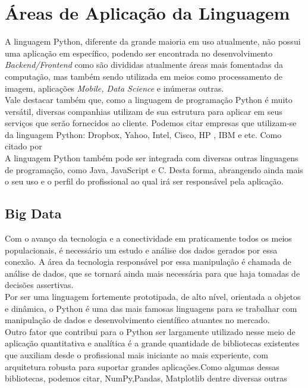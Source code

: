    \section{\'{A}reas de Aplica\c{c}\~{a}o da Linguagem}
   A linguagem Python, diferente da grande maioria em uso atualmente, não possui uma aplicação em específico, podendo ser encontrada no desenvolvimento \textit{Backend/Frontend} como são divididas atualmente áreas mais fomentadas da computação, mas também sendo utilizada em meios como processamento de imagem, aplicações \textit{Mobile, Data Science} e inúmeras outras.\\
   Vale destacar também que, como a linguagem de programação Python é muito versátil, diversas companhias utilizam de sua estrutura para aplicar em seus serviços que serão fornecidos ao cliente. Podemos citar empresas que utilizam-se da linguagem Python: Dropbox, Yahoo, Intel, Cisco, HP , IBM e etc. Como citado por \cite{Silva2019}\\
   A linguagem Python também pode ser integrada com diversas outras linguagens de programação, como Java, JavaScript e C. Desta forma, abrangendo ainda mais o seu uso e o perfil do profissional ao qual irá ser responsável pela aplicação.  

        \subsection{ Big Data}
Com o avanço da tecnologia e a conectividade em praticamente todos os meios populacionais, é necessário um estudo e análise dos dados gerados por essa conexão. A área da tecnologia responsável por essa manipulação é chamada de análise de dados, que se tornará ainda mais necessária para que haja tomadas de decisões assertivas. \\         
Por ser uma linguagem fortemente prototipada, de alto nível, orientada a objetos e dinâmica, o Python é uma das mais famosas linguagens para se trabalhar com manipulação de dados e desenvolvimento científico atuantes no mercado.\cite{McKinney2019}\\ 
Outro fator que contribui para o Python ser largamente utilizado nesse meio de aplicação quantitativa e analítica é a grande quantidade de bibliotecas existentes que auxiliam desde o profissional mais iniciante ao mais experiente, com arquitetura robusta para suportar grandes aplicações.Como algumas dessas bibliotecas, podemos citar, NumPy,Pandas, Matplotlib dentre diversas outras \\

